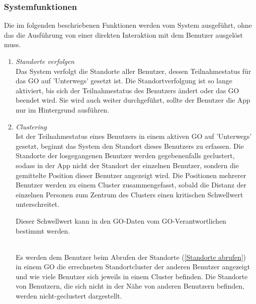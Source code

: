 \documentclass[parskip=full]{scrartcl}
\def\threedigits#1{%
  \ifnum#1<100 0\fi
  \ifnum#1<10 0\fi
  \number#1}
\begin{document}
\subsubsection{Systemfunktionen}
Die im folgenden beschriebenen Funktionen werden vom System ausgeführt, ohne das die Ausführung von einer direkten Interaktion mit dem Benutzer ausgelöst muss.
\begin{enumerate}[label={\textbf{/F\protect\threedigits{\theenumi}0/}}, leftmargin=*, resume]	
	
	\item \textit{Standorte verfolgen}\label{Standorte verfolgen}\\
	Das System verfolgt die Standorte aller Benutzer, dessen Teilnahmestatus für das GO auf 'Unterwegs' gesetzt ist. Die Standortverfolgung ist so lange aktiviert, bis sich der Teilnahmestatus des Benutzers ändert oder das GO beendet wird. Sie wird auch weiter durchgeführt, sollte der Benutzer die App nur im Hintergrund ausführen.
	
	\item \textit{\gls{Clustering}}\label{Clustering} \\
	Ist der Teilnahmestatus eines Benutzers in einem aktiven GO auf 'Unterwegs' gesetzt, beginnt das System den Standort dieses Benutzers zu erfassen. Die Standorte der losgegangenen Benutzer werden gegebenenfalls geclustert, sodass in der App nicht der Standort der einzelnen Benutzer, sondern die gemittelte Position dieser Benutzer angezeigt wird. Die Positionen mehrerer Benutzer werden zu einem Cluster zusammengefasst, sobald die Distanz der einzelnen Personen zum Zentrum des Clusters einen kritischen Schwellwert unterschreitet. \\ 
	
	\colorbox{shadecolor}{\parbox{.9\textwidth}{Dieser Schwellwert kann in den GO-Daten vom GO-Verantwortlichen bestimmt werden.}}\\
	
	 Es werden dem Benutzer beim Abrufen der Standorte (\ref{Standorte abrufen}) in einem GO die errechneten Standortcluster der anderen Benutzer angezeigt und wie viele Benutzer sich jeweils in einem Cluster befinden. Die Standorte von Benutzern, die sich nicht in der Nähe von anderen Benutzern befinden, werden nicht-geclustert dargestellt.
	

\end{enumerate}
\end{document}
